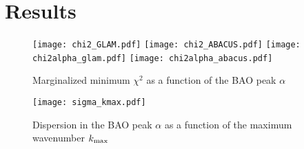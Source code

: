 \section{Results}\label{sec:results}


\begin{figure*}
\texttt{[image: chi2\_GLAM.pdf]}
\texttt{[image: chi2\_ABACUS.pdf]}
\texttt{[image: chi2alpha\_glam.pdf]}
\texttt{[image: chi2alpha\_abacus.pdf]}
\caption{Marginalized minimum $\chi^{2}$ as a function of the BAO peak $\alpha$}\label{fig:chi2alpha}
\end{figure*}

\begin{figure*}
\texttt{[image: sigma\_kmax.pdf]}
\caption{Dispersion in the BAO peak $\alpha$ as a function of the maximum wavenumber $k_{\rm max}$}
\end{figure*}


